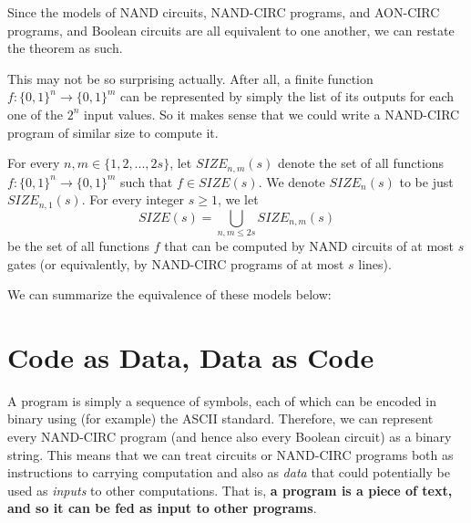   Since the models of NAND circuits, NAND-CIRC programs, and AON-CIRC programs, and Boolean circuits are all equivalent to one another, we can restate the theorem as such. 

  This may not be so surprising actually. After all, a finite function $f: \{0,1\}^n \longrightarrow \{0,1\}^m$ can be represented by simply the list of its outputs for each one of the $2^n$ input values. So it makes sense that we could write a NAND-CIRC program of similar size to compute it. 

  \begin{definition}
    For every $n, m \in \{1, 2, ..., 2s\}$, let $SIZE_{n, m} (s)$ denote the set of all functions $f: \{0,1\}^n \longrightarrow \{0,1\}^m$ such that $f \in SIZE(s)$. We denote $SIZE_n (s)$ to be just $SIZE_{n,1} (s)$. For every integer $s \geq 1$, we let 
    \[SIZE(s) = \bigcup_{n, m \leq 2s} SIZE_{n, m} (s)\]
    be the set of all functions $f$ that can be computed by NAND circuits of at most $s$ gates (or equivalently, by NAND-CIRC programs of at most $s$ lines). 
  \end{definition}

  We can summarize the equivalence of these models below: 
  \begin{center}
  \end{center}

\section{Code as Data, Data as Code}

  A program is simply a sequence of symbols, each of which can be encoded in binary using (for example) the ASCII standard. Therefore, we can represent every NAND-CIRC program (and hence also every Boolean circuit) as a binary string. This means that we can treat circuits or NAND-CIRC programs both as instructions to carrying computation and also as \textit{data} that could potentially be used as \textit{inputs} to other computations. That is, \textbf{a program is a piece of text, and so it can be fed as input to other programs}. 

